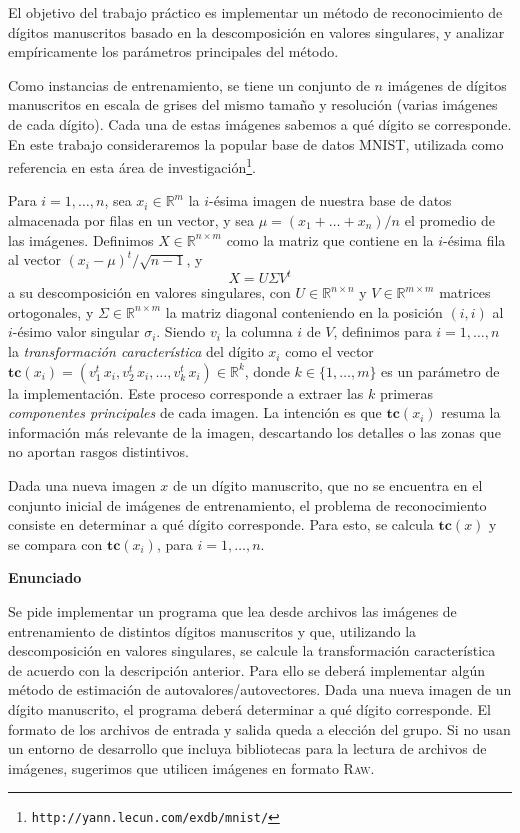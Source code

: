 \documentclass[10pt, a4paper]{article}
\newcommand{\real}{\mathbb{R}}
\begin{document}
El objetivo del trabajo pr\'actico es implementar un m\'etodo de reconocimiento de d\'igitos manuscritos basado en la descomposici\'on en valores singulares, y analizar emp\'iricamente los par\'ametros principales del m\'etodo.

Como instancias de entrenamiento, se tiene un conjunto de $n$ im\'agenes de d\'igitos ma\-nus\-cri\-tos en escala de grises del mismo tama\~no y resoluci\'on (varias im\'agenes de cada d\'igito). Cada una de estas im\'agenes sabemos a qu\'e d\'igito se corresponde.
En este trabajo consideraremos la popular base de datos MNIST, utilizada como referencia en esta \'area de investigaci\'on\footnote{\texttt{http://yann.lecun.com/exdb/mnist/}}. 

Para $i = 1,\ldots, n$, sea $x_i \in \real^{m}$ la $i$-\'esima imagen de nuestra base de datos almacenada por filas en un vector, y sea $\mu = (x_1 + \ldots + x_n)/n$ el promedio de las im\'agenes. Definimos $X\in\real^{n\times m}$ como la matriz que contiene en la $i$-\'esima fila al vector $(x_i - \mu)^{t}/\sqrt{n-1}$, y $$X=U \Sigma V^t$$ a su descomposici\'on en valores singulares, con $U\in\real^{n\times n}$ y $V\in\real^{m\times m}$ matrices ortogonales, y $\Sigma\in\real^{n\times m}$ la matriz diagonal conteniendo en la posici\'on $(i,i)$ al $i$-\'esimo valor singular $\sigma_i$.
Siendo $v_i$ la columna $i$ de $V$, definimos para $i = 1,\ldots,n$ la \textsl{transformaci\'on caracter\'istica} del d\'igito $x_{i}$ como el vector $\mathbf{tc}(x_i) = (v_1^t\, x_i, v_2^t\, x_i,\ldots,v_k^t\, x_i) \in\real^k$, donde $k \in\{1,\ldots,m\}$ es un par\'ametro de la implementaci\'on. Este proceso corresponde a extraer las $k$ primeras \textit{componentes principales} de cada imagen. La intenci\'on es que $\mathbf{tc}(x_i)$ resuma la informaci\'on m\'as relevante de la imagen, descartando los detalles o las zonas que no aportan rasgos distintivos.


Dada una nueva imagen $x$ de un d\'igito manuscrito, que no se encuentra en el conjunto inicial de im\'agenes de entrenamiento, el problema de reconocimiento consiste en determinar a qu\'e d\'igito corresponde. Para esto, se calcula $\mathbf{tc}(x)$ y se compara con $\mathbf{tc}(x_i)$, para $i = 1,\ldots, n$.


{\bf Enunciado}

Se pide implementar un programa que lea desde archivos las im\'agenes de entrenamiento de distintos d\'igitos manuscritos y que, utilizando la descomposici\'on en valores singulares, se calcule la transformaci\'on caracter\'istica de acuerdo con la descripci\'on anterior. Para ello se deber\'a implementar alg\'un m\'etodo de estimaci\'on de autovalores/autovectores. Dada una nueva imagen de un d\'igito manuscrito, el programa deber\'a determinar a qu\'e d\'igito co\-rres\-pon\-de.
El formato de los archivos de entrada y salida queda a elecci\'on del grupo. Si no usan un entorno de desarrollo que incluya bibliotecas para la lectura de archivos de im\'agenes, sugerimos que utilicen im\'agenes en formato \textsc{Raw}. 
\end{document}

